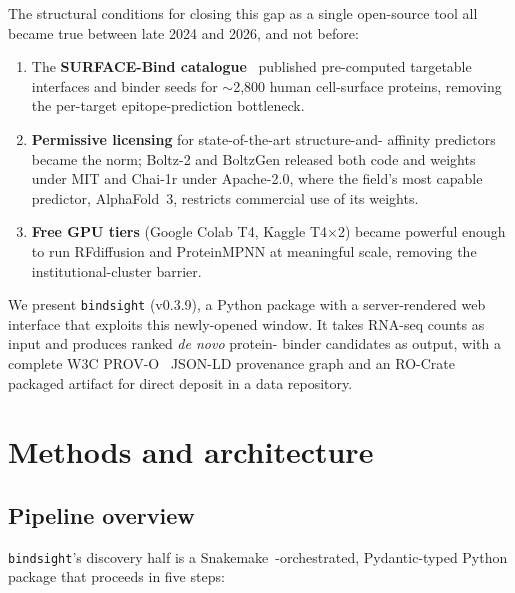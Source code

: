 \documentclass[11pt,letterpaper]{article}
\begin{document}
The structural conditions for closing this gap as a single open-source tool
all became true between late 2024 and 2026, and not before:

\begin{enumerate}
  \item The \textbf{SURFACE-Bind catalogue}~\cite{Balbi2026} published
        pre-computed targetable interfaces and binder seeds for $\sim$2{,}800
        human cell-surface proteins, removing the per-target epitope-prediction
        bottleneck.
  \item \textbf{Permissive licensing} for state-of-the-art structure-and-
        affinity predictors became the norm; Boltz-2 and BoltzGen released
        both code and weights under MIT and Chai-1r under Apache-2.0, where
        the field's most capable predictor, AlphaFold~3, restricts commercial
        use of its weights.
  \item \textbf{Free GPU tiers} (Google Colab T4, Kaggle T4$\times$2)
        became powerful enough to run RFdiffusion and ProteinMPNN at
        meaningful scale, removing the institutional-cluster barrier.
\end{enumerate}

We present \texttt{bindsight} (v0.3.9), a Python package with a
server-rendered web interface that exploits this newly-opened window. It
takes RNA-seq counts as input and produces ranked \textit{de novo} protein-
binder candidates as output, with a complete W3C PROV-O~\cite{PROVO}
JSON-LD provenance graph and an RO-Crate~\cite{SoilandReyes2022} packaged
artifact for direct deposit in a data repository.

\section{Methods and architecture}

\subsection{Pipeline overview}

\texttt{bindsight}'s discovery half is a Snakemake~\cite{Molder2021}-orchestrated,
Pydantic-typed Python package that proceeds in five steps:
\end{document}
